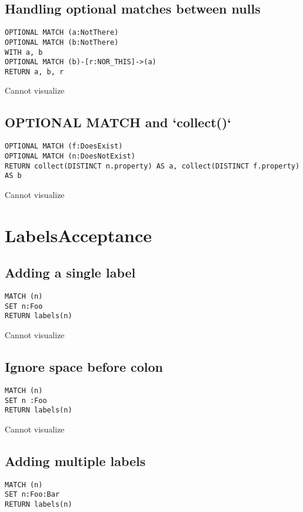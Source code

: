 \subsection{Handling optional matches between nulls}

\begin{lstlisting}
OPTIONAL MATCH (a:NotThere)
OPTIONAL MATCH (b:NotThere)
WITH a, b
OPTIONAL MATCH (b)-[r:NOR_THIS]->(a)
RETURN a, b, r
\end{lstlisting}

Cannot visualize
\subsection{OPTIONAL MATCH and `collect()`}

\begin{lstlisting}
OPTIONAL MATCH (f:DoesExist)
OPTIONAL MATCH (n:DoesNotExist)
RETURN collect(DISTINCT n.property) AS a, collect(DISTINCT f.property) AS b
\end{lstlisting}

Cannot visualize
\section{LabelsAcceptance}

\subsection{Adding a single label}

\begin{lstlisting}
MATCH (n)
SET n:Foo
RETURN labels(n)
\end{lstlisting}

Cannot visualize
\subsection{Ignore space before colon}

\begin{lstlisting}
MATCH (n)
SET n :Foo
RETURN labels(n)
\end{lstlisting}

Cannot visualize
\subsection{Adding multiple labels}

\begin{lstlisting}
MATCH (n)
SET n:Foo:Bar
RETURN labels(n)
\end{lstlisting}

